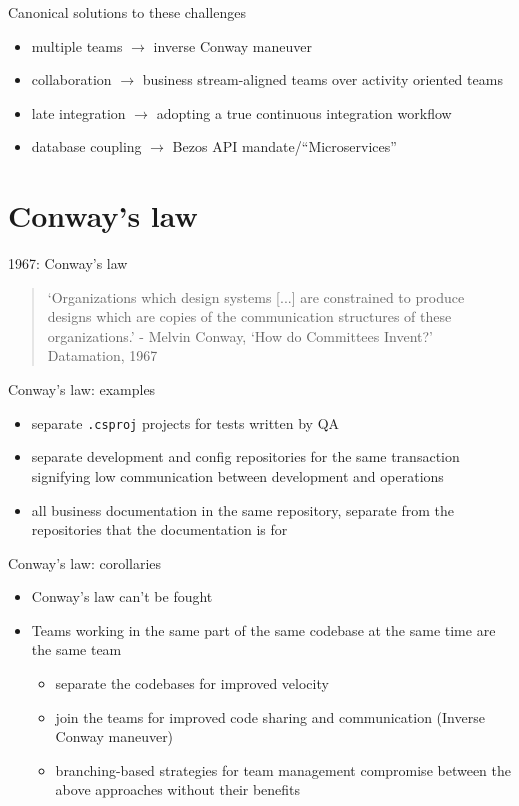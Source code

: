 \documentclass{beamer}
\begin{document}
	\begin{frame}{Canonical solutions to these challenges}
		\begin{itemize}
			\item multiple teams $\rightarrow$ inverse Conway maneuver \pause
			\item collaboration $\rightarrow$ business stream-aligned teams over activity oriented teams \pause
			\item late integration $\rightarrow$ adopting a true continuous integration workflow \pause
			\item database coupling $\rightarrow$ Bezos API mandate/``Microservices'' 	
		\end{itemize}
	\end{frame}
	\section{Conway's law}
	\begin{frame}{1967: Conway's law}
		\begin{quote}
			`Organizations which design systems [...] are constrained to produce designs which are copies of the communication structures of these organizations.' - Melvin Conway, `How do Committees Invent?' Datamation, 1967
		\end{quote}
	\end{frame}
	\begin{frame}{Conway's law: examples}
		\begin{itemize}
			\item separate \texttt{.csproj} projects for tests written by QA 
			\item separate development and config repositories for the same transaction signifying low communication between development and operations 
			\item all business documentation in the same repository, separate from the repositories that the documentation is for 
		\end{itemize}
	\end{frame}
	\begin{frame}{Conway's law: corollaries}
		\begin{itemize}
			\item Conway's law can't be fought 
			\item Teams working in the same part of the same codebase at the same time are the same team 
			\begin{itemize}
				\item separate the codebases for improved velocity 
				\item join the teams for improved code sharing and communication (Inverse Conway maneuver)  
				\item branching-based strategies for team management compromise between the above approaches without their benefits
			\end{itemize}
		\end{itemize}
	\end{frame}
	
\end{document}
